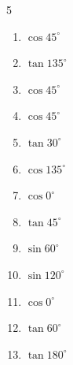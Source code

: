 \begin{multicols}{5}
\begin{enumerate}
  \item $\displaystyle \cos{45^\circ}$


  \item $\displaystyle \tan{135^\circ}$

        \phantom{$\displaystyle =-1$}

  \item $\displaystyle \cos{45^\circ}$


  \item $\displaystyle \cos{45^\circ}$


  \item $\displaystyle \tan{30^\circ}$


  \item $\displaystyle \cos{135^\circ}$


  \item $\displaystyle \cos{0^\circ}$

        \phantom{$\displaystyle =1$}

  \item $\displaystyle \tan{45^\circ}$

        \phantom{$\displaystyle =1$}

  \item $\displaystyle \sin{60^\circ}$


\columnbreak %

  \item $\displaystyle \sin{120^\circ}$


  \item $\displaystyle \cos{0^\circ}$

        \phantom{$\displaystyle =1$}

  \item $\displaystyle \tan{60^\circ}$


  \item $\displaystyle \tan{180^\circ}$


\end{enumerate}
\end{multicols}
